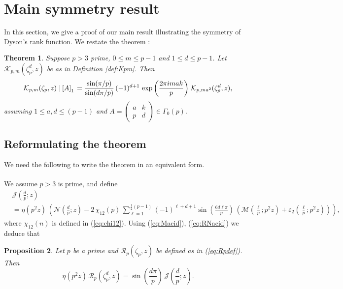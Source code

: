 \documentclass[12pt]{amsart}
\newtheorem{theorem}{Theorem}[section]
\newtheorem{prop}[theorem]{Proposition}
\theoremstyle{definition}
\theoremstyle{remark}
\numberwithin{equation}{section}
\newcommand\Lpar[1]{\left(#1\right)}
\newcommand\Mell[3]{\mathcal{M}\left(\frac{#1}{#2};#3\right)}
\newcommand\Nell[3]{\mathcal{N}\left(\frac{#1}{#2};#3\right)}
\newcommand\Jdpz[1]{\mathcal{J}\left(\frac{d}{p};{#1}\right)}
\newcommand\Rpz[1]{\mathcal{R}_p\left(#1\right)}
\newcommand\stroke[3]{#1\,\left\arrowvert\,\left[#2\right]_{#3}\right.}
\newcommand\eqn[1]{(\ref{eq:#1})}
\newcommand\refdef[1]{\ref{def:#1}}
\begin{document}



\section{Main symmetry result}

In this section, we give a proof of our main result illustrating the symmetry of Dyson's rank function. We restate the theorem :

\begin{theorem}
\label{thm:newKpmtrans}
Suppose $p>3$ prime, $0 \le m \le p-1$ and $1 \le d \le p-1$. Let $\mathcal{K}_{p,m}(\zeta_p^d, z)$ be as in Definition \refdef{Kpm}. Then
$$\stroke{\mathcal{K}_{p,m}(\zeta_p, z)}{A}{1}
= \frac{\sin(\pi/p)}{\sin(d\pi/p)}\,(-1)^{d+1}\,
\exp\Lpar{\frac{2\pi imak}{p}}\,\mathcal{K}_{p,ma^2}(\zeta_p^d,z),$$ assuming $1 \le a,d \le (p-1)$ and
$
A = \begin{pmatrix}
      a & k \\ p & d 
    \end{pmatrix}
\in \Gamma_0(p).
$         

\end{theorem}

\subsection{Reformulating the theorem} We need the following to write the theorem in an equivalent form.
\\\\
We assume $p>3$ is prime, and define
\begin{align}      
&\Jdpz{z}{}
\label{eq:Jdef}\\
&= \eta(p^2 z) \,
\left(\Nell{d}{p}{z} - 
2\,\chi_{12}(p) \,
\sum_{\ell=1}^{\frac{1}{2}(p-1)} (-1)^{\ell + d + 1}
\sin\Lpar{\frac{6d\ell\pi}{p}} \,
\left(
\Mell{\ell}{p}{p^2z} + \varepsilon_2\Lpar{\frac{\ell}{p};p^2z}
\right)\right),
\nonumber          
\end{align}
where $\chi_{12}(n)$ is defined in \eqn{chi12}.
Using \eqn{Macid}, \eqn{RNacid} we deduce that

\begin{prop}
\label{propo:RpJ} 
Let $p$ be a prime and $\Rpz{\zeta_p,z}$ be defined as in \eqn{Rpdef}. Then 
$$
\eta(p^2 z) \, \Rpz{\zeta_p^d,z} 
=
\sin\Lpar{\frac{d\pi}{p}} \, \Jdpz{z}{}.
$$
\end{prop}
\end{document}
